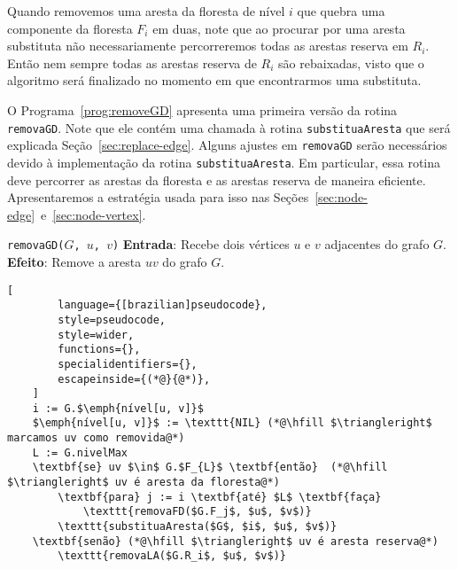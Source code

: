 Quando removemos uma aresta da floresta de nível $i$ que quebra uma componente da floresta $F_i$ em duas, note que ao procurar por uma aresta substituta não necessariamente percorreremos todas as arestas reserva em $R_i$. Então nem sempre todas as arestas reserva de $R_i$ são rebaixadas, visto que o algoritmo será finalizado no momento em que encontrarmos uma substituta.

O Programa~\ref{prog:removeGD} apresenta uma primeira versão da rotina \texttt{removaGD}. Note que ele contém uma chamada à rotina \texttt{substituaAresta} que será explicada Seção~\ref{sec:replace-edge}. Alguns ajustes em \texttt{removaGD} serão necessários devido à implementação da rotina \texttt{substituaAresta}. 
Em particular, essa rotina deve percorrer as arestas da floresta e as arestas reserva de maneira eficiente. Apresentaremos a estratégia usada para isso nas Seções~\ref{sec:node-edge}~e~\ref{sec:node-vertex}.

\begin{programruledcaption}{\texttt{removaGD($G$, $u$, $v$)} \label{prog:removeGD}}
    \noindent\textbf{Entrada}: Recebe dois vértices $u$ e $v$ adjacentes do grafo $G$. \\
    \noindent\textbf{Efeito}: Remove a aresta $uv$ do grafo $G$. 
    \vspace{-0.5\baselineskip}
    \begin{lstlisting}[
        language={[brazilian]pseudocode},
        style=pseudocode,
        style=wider,
        functions={},
        specialidentifiers={},
        escapeinside={(*@}{@*)},
    ]
    i := G.$\emph{nível[u, v]}$
    $\emph{nível[u, v]}$ := \texttt{NIL} (*@\hfill $\triangleright$ marcamos uv como removida@*)
    L := G.nivelMax
    \textbf{se} uv $\in$ G.$F_{L}$ \textbf{então}  (*@\hfill $\triangleright$ uv é aresta da floresta@*)
        \textbf{para} j := i \textbf{até} $L$ \textbf{faça}
            \texttt{removaFD($G.F_j$, $u$, $v$)}
        \texttt{substituaAresta($G$, $i$, $u$, $v$)}
    \textbf{senão} (*@\hfill $\triangleright$ uv é aresta reserva@*)
        \texttt{removaLA($G.R_i$, $u$, $v$)}
    \end{lstlisting}
    \vspace{-0.5\baselineskip}
\end{programruledcaption}









































